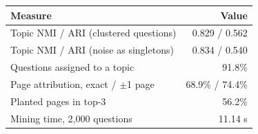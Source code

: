 \begin{tabular}{@{}lr@{}}
\toprule
Measure & Value \\
\midrule
Topic NMI / ARI (clustered questions) & 0.829 / 0.562 \\
Topic NMI / ARI (noise as singletons) & 0.834 / 0.540 \\
Questions assigned to a topic & 91.8\% \\
Page attribution, exact / $\pm$1 page & 68.9\% / 74.4\% \\
Planted pages in top-3 & 56.2\% \\
Mining time, 2,000 questions & 11.14 s \\
\bottomrule
\end{tabular}
